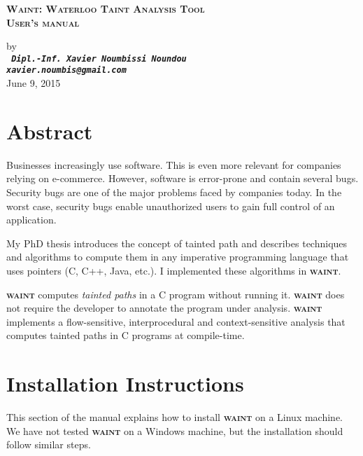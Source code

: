 \documentclass[12pt,onecolumn,a4paper]{article}
\newcommand{\waint}{\textsc{\textbf{waint}}\xspace}
\begin{document}
\pagestyle{empty}

\author{Xavier NOUMBISSI NOUNDOU}

\begin{center}
\begin{LARGE}
\textbf{ \textsc{Waint: Waterloo Taint Analysis Tool\\
				User's manual}}\\
\end{LARGE}
\begin{large}
\vspace{0.3cm}
by\\
\vspace{0.3cm}
\texttt{ \bf \textit{Dipl.-Inf. Xavier Noumbissi Noundou\\
xavier.noumbis@gmail.com}}\\
\vspace{0.3cm}
June 9, 2015\\
\vspace{1.3cm}
\end{large}
\end{center}

\tableofcontents

\section{Abstract}
Businesses increasingly use software. This is even more
relevant for companies relying on e-commerce. However,
software is error-prone and contain several bugs. Security
bugs are one of the major problems faced by companies today.
In the worst case, security bugs enable unauthorized users
to gain full control of an application.

My PhD thesis introduces the concept of tainted path and
describes techniques and algorithms to compute them in
any imperative programming language that uses
pointers (C, C++, Java, etc.). I implemented these
algorithms in \waint.

\waint computes \textcolor{firebrickred}{\textit{tainted paths}}
in a C program without running it. \waint does not require
the developer to annotate the program under analysis.
\waint implements a flow-sensitive, interprocedural and
context-sensitive analysis that computes tainted paths in
C programs at compile-time.

\section{Installation Instructions}
This section of the manual explains how to install \waint
on a Linux machine. We have not tested \waint on a Windows
machine, but the installation should follow similar steps. 
\end{document}
